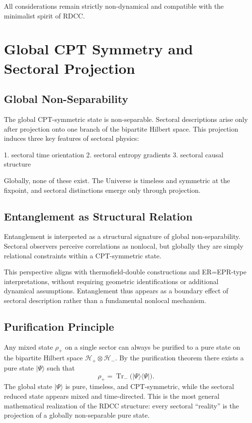 \documentclass[11pt,a4paper]{article}
\begin{document}
All considerations remain strictly non-dynamical and compatible with the minimalist spirit of RDCC.

\section{Global CPT Symmetry and Sectoral Projection}

\subsection{Global Non-Separability}

The global CPT-symmetric state is non-separable. Sectoral descriptions arise only after projection onto one branch of the bipartite Hilbert space. This projection induces three key features of sectoral physics:

1. sectoral time orientation  
2. sectoral entropy gradients  
3. sectoral causal structure  

Globally, none of these exist. The Universe is timeless and symmetric at the fixpoint, and sectoral distinctions emerge only through projection.

\subsection{Entanglement as Structural Relation}

Entanglement is interpreted as a structural signature of global non-separability. Sectoral observers perceive correlations as nonlocal, but globally they are simply relational constraints within a CPT-symmetric state.

This perspective aligns with thermofield-double constructions and ER=EPR-type interpretations, without requiring geometric identifications or additional dynamical assumptions. Entanglement thus appears as a boundary effect of sectoral description rather than a fundamental nonlocal mechanism.

\subsection{Purification Principle}

Any mixed state $\rho_+$ on a single sector can always be purified to a pure state on the bipartite Hilbert space $\mathcal{H}_+ \otimes \mathcal{H}_-$. By the purification theorem there exists a pure state $|\Psi\rangle$ such that
\[
\rho_+ = \operatorname{Tr}_- \big( |\Psi\rangle\langle\Psi| \big).
\]
The global state $|\Psi\rangle$ is pure, timeless, and CPT-symmetric, while the sectoral reduced state appears mixed and time-directed. This is the most general mathematical realization of the RDCC structure: every sectoral “reality” is the projection of a globally non-separable pure state.
\end{document}
